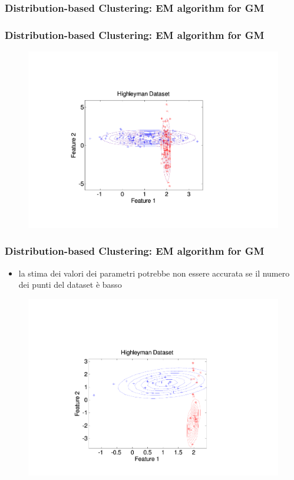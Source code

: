 \begin{frame}

	\frametitle{{\color{GradientDescentDiagramOrange}Distribution-based Clustering}: EM algorithm for GM}	\centering
\end{frame}


\begin{frame}

	\frametitle{{\color{GradientDescentDiagramOrange}Distribution-based Clustering}: EM algorithm for GM}
		\begin{figure}[!htbp]
			\centering
			\includegraphics[width=0.6\linewidth]{images/unsupervised/gaussian_mixture/gmm_2.pdf}
		\end{figure}

\end{frame}


\begin{frame}

	\frametitle{{\color{GradientDescentDiagramOrange}Distribution-based Clustering}: EM algorithm for GM}

		\begin{itemize}
			\item la stima dei valori dei parametri potrebbe non essere accurata se il numero dei punti del dataset è basso
		\end{itemize}
		\begin{figure}[!htbp]
			\centering
			\includegraphics[width=0.6\linewidth]{images/unsupervised/gaussian_mixture/gmm_3.pdf}
		\end{figure}

\end{frame}


